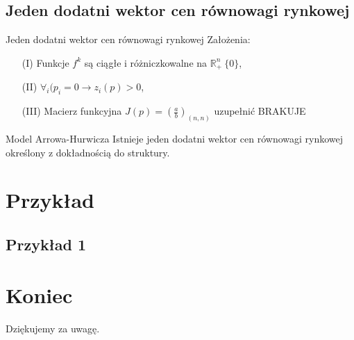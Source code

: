 \documentclass[a4paper, 11pt]{beamer}
\begin{document}
    \subsection{Jeden dodatni wektor cen równowagi rynkowej}
      \begin{frame}{Jeden dodatni wektor cen równowagi rynkowej}
	Założenia:
	\begin{enumerate}
	  \item[(I)] Funkcje $f^k$ są ciągłe i różniczkowalne na
	  $\mathbb{R}^n_{+} \ \{0\}$,

	  \item[(II)] $\forall_i (p_i = 0 \rightarrow z_i (p) > 0$,

	  \item[(III)] Macierz funkcyjna $J(p) = (\frac{a}{b})_{(n, n)}$
	  uzupełnić BRAKUJE
	\end{enumerate}

	\begin{block}{Model Arrowa-Hurwicza}
	  Istnieje jeden dodatni wektor cen równowagi rynkowej określony z
	  dokładnością do struktury.
	\end{block}
      \end{frame}

  \section{Przykład}
    \subsection{Przykład 1}

  \section*{Koniec}
    \begin{frame}
      \begin{center}
	Dziękujemy za uwagę.
      \end{center}
    \end{frame}
\end{document}
